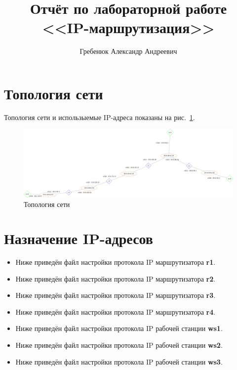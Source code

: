 \documentclass[a4paper,12pt]{article}
\title{Отчёт по лабораторной работе \\ <<IP-маршрутизация>>}
\author{Гребенюк Александр Андреевич}
\begin{document}
\maketitle

\tableofcontents

\clearpage


\section{Топология сети}

Топология сети и использыемые IP-адреса показаны на рис.~\ref{fig:network}.

\begin{figure}[h]
\centering
\includegraphics[width=\textwidth]{includes/network_gv.pdf}
\caption{Топология сети}
\label{fig:network}
\end{figure}


\section{Назначение IP-адресов}
\begin{itemize}
\item Ниже приведён файл настройки протокола IP маршрутизатора \textbf{r1}.
\item Ниже приведён файл настройки протокола IP маршрутизатора \textbf{r2}.
\item Ниже приведён файл настройки протокола IP маршрутизатора \textbf{r3}.
\item Ниже приведён файл настройки протокола IP маршрутизатора \textbf{r4}.

\item Ниже приведён файл настройки протокола IP рабочей станции \textbf{ws1}.
\item Ниже приведён файл настройки протокола IP рабочей станции \textbf{ws2}.
\item Ниже приведён файл настройки протокола IP рабочей станции \textbf{ws3}.
\end{itemize}
\end{document}
